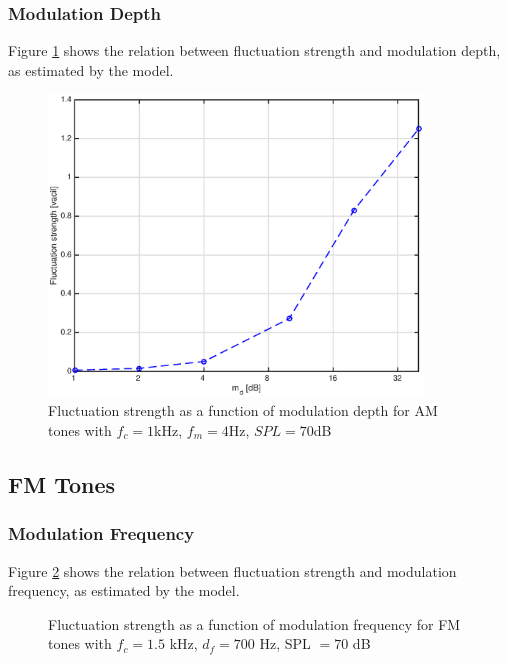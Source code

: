 \documentclass[a4paper]{article}
\begin{document}
\subsubsection{Modulation Depth}

Figure \ref{fig:AMtonesmdplot} shows the relation between fluctuation strength
and modulation depth, as estimated by the model.

\begin{figure}[ht]
    \centering
    \includegraphics[height=8cm]{img/am_tones_md_plot}
    \caption{Fluctuation strength as a function of modulation depth for AM tones
        with $f_c = 1 $kHz, $f_m = 4 $Hz, $SPL = 70 $dB}
    \label{fig:AMtonesmdplot}
\end{figure}

\subsection{FM Tones}

\subsubsection{Modulation Frequency}

Figure \ref{fig:FMtonesfmplot} shows the relation between fluctuation strength
and modulation frequency, as estimated by the model.

\begin{figure}[ht]
    \centering
    \resizebox{!}{8cm}{
        
    }
    \caption{Fluctuation strength as a function of modulation frequency for FM
        tones with $f_c = 1.5$ kHz, $d_f = 700$ Hz, SPL $= 70$ dB}
    \label{fig:FMtonesfmplot}
\end{figure}
\end{document}
